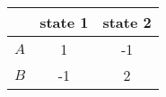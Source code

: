 \documentclass[]{standalone}
\begin{document}
\bgroup
\def\arraystretch{2}%
\begin{tabular}{|c|c|c|}
\hline
  & state 1 & state 2    \\ \hline
$A$ & 1 & -1   \\ \hline
$B$ & -1 & 2    \\ \hline
\end{tabular}
\egroup
\end{document}
